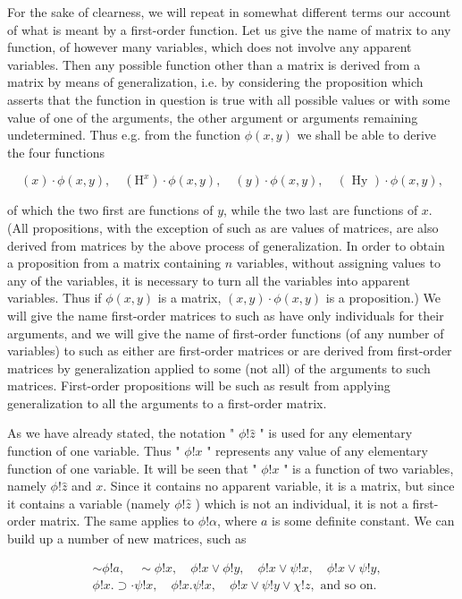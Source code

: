 \documentclass[10pt]{article}
\begin{document}
For the sake of clearness, we will repeat in somewhat different terms our account of what is meant by a first-order function. Let us give the name of matrix to any function, of however many variables, which does not involve any apparent variables. Then any possible function other than a matrix is derived from a matrix by means of generalization, i.e. by considering the proposition which asserts that the function in question is true with all possible values or with some value of one of the arguments, the other argument or arguments remaining undetermined. Thus e.g. from the function $\phi(x, y)$ we shall be able to derive the four functions

$$
(x) \cdot \phi(x, y), \quad\left(\mathrm{H}^{x}\right) \cdot \phi(x, y), \quad(y) \cdot \phi(x, y), \quad(\text { Hy }) \cdot \phi(x, y),
$$

of which the two first are functions of $y$, while the two last are functions of $x$. (All propositions, with the exception of such as are values of matrices, are also derived from matrices by the above process of generalization. In order to obtain\\
a proposition from a matrix containing $n$ variables, without assigning values to any of the variables, it is necessary to turn all the variables into apparent variables. Thus if $\phi(x, y)$ is a matrix, $(x, y) \cdot \phi(x, y)$ is a proposition.) We will give the name first-order matrices to such as have only individuals for their arguments, and we will give the name of first-order functions (of any number of variables) to such as either are first-order matrices or are derived from first-order matrices by generalization applied to some (not all) of the arguments to such matrices. First-order propositions will be such as result from applying generalization to all the arguments to a first-order matrix.

As we have already stated, the notation " $\phi!\hat{z}$ " is used for any elementary function of one variable. Thus " $\phi!x$ " represents any value of any elementary function of one variable. It will be seen that " $\phi!x$ " is a function of two variables, namely $\phi!\hat{z}$ and $x$. Since it contains no apparent variable, it is a matrix, but since it contains a variable (namely $\phi!\hat{z}$ ) which is not an individual, it is not a first-order matrix. The same applies to $\phi!\alpha$, where $a$ is some definite constant. We can build up a number of new matrices, such as

$$
\begin{aligned}
& \sim \phi!a, \quad \sim \phi!x, \quad \phi!x \vee \phi!y, \quad \phi!x \vee \psi!x, \quad \phi!x \vee \psi!y, \\
& \phi!x . \supset \cdot \psi!x, \quad \phi!x . \psi!x, \quad \phi!x \vee \psi!y \vee \chi!z, \text { and so on. }
\end{aligned}
$$
\end{document}
